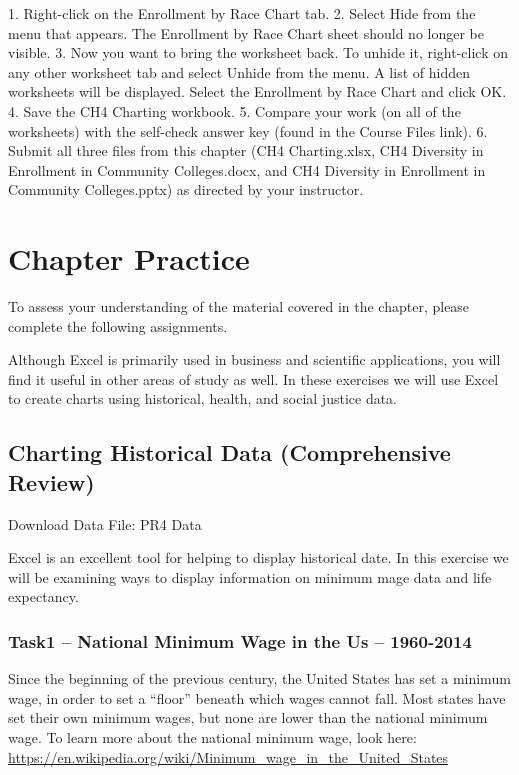 1. Right-click on the Enrollment by Race Chart tab.
2. Select Hide from the menu that appears. The Enrollment by Race Chart sheet should no longer
be visible.
3. Now you want to bring the worksheet back. To unhide it, right-click on any other worksheet
tab and select Unhide from the menu. A list of hidden worksheets will be displayed. Select the
Enrollment by Race Chart and click OK.
4. Save the CH4 Charting workbook.
5. Compare your work (on all of the worksheets) with the self-check answer key (found in the
Course Files link).
6. Submit all three files from this chapter (CH4 Charting.xlsx, CH4 Diversity in Enrollment in
Community Colleges.docx, and CH4 Diversity in Enrollment in Community
Colleges.pptx) as directed by your instructor.





\section{Chapter Practice}




To assess your understanding of the material covered in the chapter, please complete the following
assignments.

Although Excel is primarily used in business and scientific applications, you will find it useful in other
areas of study as well. In these exercises we will use Excel to create charts using historical, health, and
social justice data.

\subsection{Charting Historical Data (Comprehensive Review)}

Download Data File: PR4 Data

Excel is an excellent tool for helping to display historical date. In this exercise we will be examining
ways to display information on minimum mage data and life expectancy.



\subsubsection{Task1 – National Minimum Wage in the Us – 1960-2014}

Since the beginning of the previous century, the United States has set a minimum wage, in order to set
a “floor” beneath which wages cannot fall. Most states have set their own minimum wages, but none
are lower than the national minimum wage. To learn more about the national minimum wage, look
here: \url{https://en.wikipedia.org/wiki/Minimum_wage_in_the_United_States}

